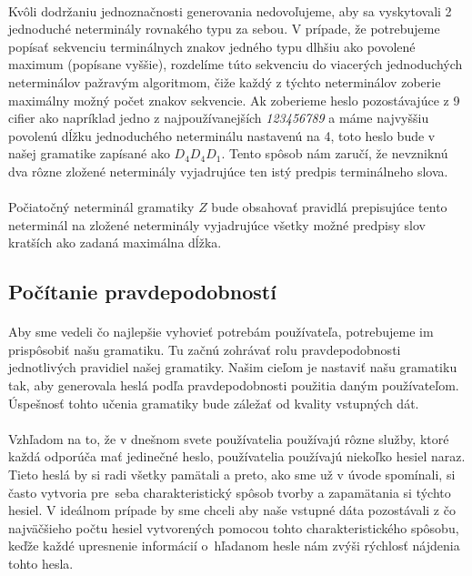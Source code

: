 \paragraph{}
Kvôli dodržaniu jednoznačnosti generovania nedovoľujeme, aby sa vyskytovali 2 jednoduché neterminály rovnakého typu za sebou. V prípade, že potrebujeme popísať sekvenciu terminálnych znakov jedného typu dlhšiu ako povolené maximum (popísane vyššie), rozdelíme túto sekvenciu do viacerých jednoduchých neterminálov pažravým algoritmom, čiže každý z týchto neterminálov zoberie maximálny možný počet znakov sekvencie. Ak zoberieme heslo pozostávajúce z 9 cifier ako napríklad jedno z najpoužívanejších \emph{123456789} a máme najvyššiu povolenú dĺžku jednoduchého neterminálu nastavenú na 4, toto heslo bude v našej gramatike zapísané ako \(D_4D_4D_1\). Tento spôsob nám zaručí, že nevzniknú dva rôzne zložené neterminály vyjadrujúce ten istý predpis terminálneho slova.

\paragraph{}
Počiatočný neterminál gramatiky \(Z\) bude obsahovať pravidlá prepisujúce tento neterminál na zložené neterminály vyjadrujúce všetky možné predpisy slov kratších ako zadaná maximálna dĺžka.

\subsection{Počítanie pravdepodobností}
\label{sec:Probability}
\paragraph{}
Aby sme vedeli čo najlepšie vyhovieť potrebám používateľa, potrebujeme im prispôsobiť našu gramatiku. Tu začnú zohrávať rolu pravdepodobnosti jednotlivých pravidiel našej gramatiky. Našim cieľom je nastaviť našu gramatiku tak, aby generovala heslá podľa pravdepodobnosti použitia daným používateľom. Úspešnosť tohto učenia gramatiky bude záležať od kvality vstupných dát.
\paragraph{}
Vzhľadom na to, že v dnešnom svete používatelia používajú rôzne služby, ktoré každá odporúča mať jedinečné heslo, používatelia používajú niekoľko hesiel naraz. Tieto heslá by si radi všetky pamätali a preto, ako sme už v úvode spomínali, si často vytvoria pre~seba charakteristický spôsob tvorby a zapamätania si týchto hesiel. V ideálnom prípade by sme chceli aby naše vstupné dáta pozostávali z čo najväčšieho počtu hesiel vytvorených pomocou tohto charakteristického spôsobu, keďže každé upresnenie informácií o~hľadanom hesle nám zvýši rýchlosť nájdenia tohto hesla.
